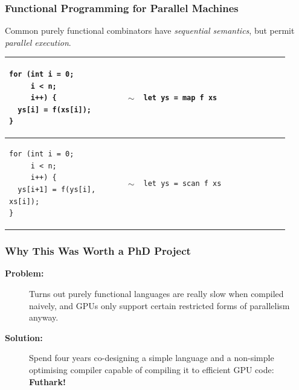 \documentclass[rgb,dvipsnames]{beamer}
\begin{document}
\begin{frame}[fragile]
  \frametitle{Functional Programming for Parallel Machines}

  Common purely functional combinators have \textit{sequential
    semantics}, but permit \textit{parallel execution}.

  \begin{tabular}{p{0.4\linewidth}p{0.03\linewidth}p{0.49\linewidth}}
\begin{verbatim}
for (int i = 0;
     i < n;
     i++) {
  ys[i] = f(xs[i]);
}
\end{verbatim}
    & \vspace{0.4cm}$\sim$ &
\begin{verbatim}
let ys = map f xs
\end{verbatim}
    \\\hline
\begin{verbatim}
for (int i = 0;
     i < n;
     i++) {
  ys[i+1] = f(ys[i], xs[i]);
}
\end{verbatim}
    & \vspace{0.4cm} $\sim$ &
\begin{verbatim}
let ys = scan f xs
\end{verbatim}
    \\
  \end{tabular}
\end{frame}

\begin{frame}
  \frametitle{Why This Was Worth a PhD Project}

  \begin{description}
  \item[\textbf{Problem:}] Turns out purely functional languages are
    really slow when compiled naively, and GPUs only support certain
    restricted forms of parallelism anyway.

  \pause\item[\textbf{Solution:}] Spend four years co-designing a simple
    language and a non-simple optimising compiler capable of compiling
    it to efficient GPU code: \textbf{Futhark!}
  \end{description}
\end{frame}
\end{document}
